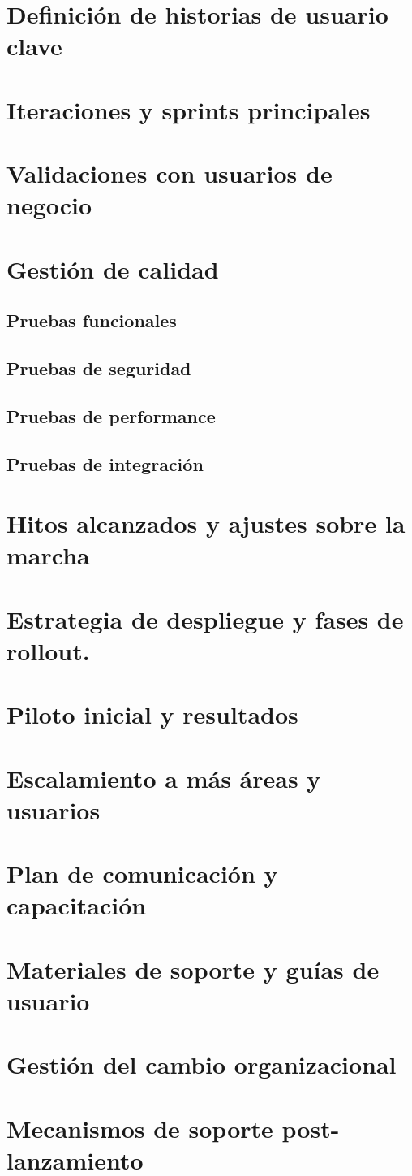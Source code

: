 \section{Definición de historias de usuario clave}

\section{Iteraciones y sprints principales}

\section{Validaciones con usuarios de negocio}

\section{Gestión de calidad}

\subsection{Pruebas funcionales}

\subsection{Pruebas de seguridad}
\subsection{Pruebas de performance}
\subsection{Pruebas de integración}
\section{Hitos alcanzados y ajustes sobre la marcha}
\section{Estrategia de despliegue y fases de rollout.}
\section{Piloto inicial y resultados}
\section{Escalamiento a más áreas y usuarios}
\section{Plan de comunicación y capacitación}
\section{Materiales de soporte y guías de usuario}
\section{Gestión del cambio organizacional}
\section{Mecanismos de soporte post-lanzamiento}

